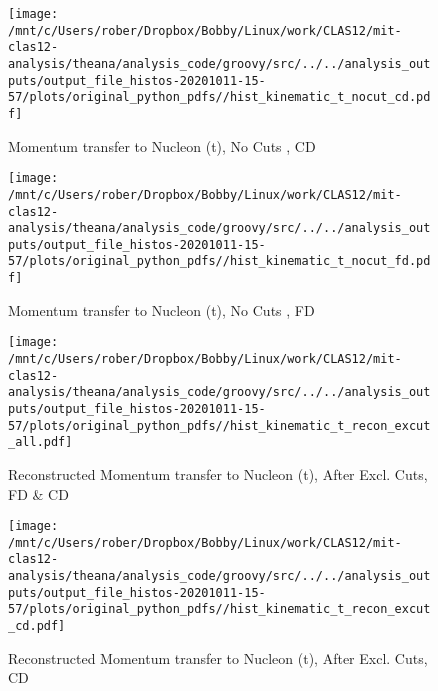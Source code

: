 \documentclass{article}
\begin{document}
\begin{landscape}
    \begin{figure}[h]
        \centering

        \texttt{[image: /mnt/c/Users/rober/Dropbox/Bobby/Linux/work/CLAS12/mit-clas12-analysis/theana/analysis\_code/groovy/src/../../analysis\_outputs/output\_file\_histos-20201011-15-57/plots/original\_python\_pdfs//hist\_kinematic\_t\_nocut\_cd.pdf]}
        \captionsetup{textformat=empty,labelformat=blank}
        \caption{Momentum transfer to Nucleon (t), No Cuts , CD}
    \end{figure}
    \clearpage
    
    \begin{figure}[h]
        \centering

        \texttt{[image: /mnt/c/Users/rober/Dropbox/Bobby/Linux/work/CLAS12/mit-clas12-analysis/theana/analysis\_code/groovy/src/../../analysis\_outputs/output\_file\_histos-20201011-15-57/plots/original\_python\_pdfs//hist\_kinematic\_t\_nocut\_fd.pdf]}
        \captionsetup{textformat=empty,labelformat=blank}
        \caption{Momentum transfer to Nucleon (t), No Cuts , FD}
    \end{figure}
    \clearpage
    
    \begin{figure}[h]
        \centering

        \texttt{[image: /mnt/c/Users/rober/Dropbox/Bobby/Linux/work/CLAS12/mit-clas12-analysis/theana/analysis\_code/groovy/src/../../analysis\_outputs/output\_file\_histos-20201011-15-57/plots/original\_python\_pdfs//hist\_kinematic\_t\_recon\_excut\_all.pdf]}
        \captionsetup{textformat=empty,labelformat=blank}
        \caption{Reconstructed Momentum transfer to Nucleon (t), After Excl. Cuts, FD \& CD}
    \end{figure}
    \clearpage
    
    \begin{figure}[h]
        \centering

        \texttt{[image: /mnt/c/Users/rober/Dropbox/Bobby/Linux/work/CLAS12/mit-clas12-analysis/theana/analysis\_code/groovy/src/../../analysis\_outputs/output\_file\_histos-20201011-15-57/plots/original\_python\_pdfs//hist\_kinematic\_t\_recon\_excut\_cd.pdf]}
        \captionsetup{textformat=empty,labelformat=blank}
        \caption{Reconstructed Momentum transfer to Nucleon (t), After Excl. Cuts, CD}
    \end{figure}
    \clearpage
    
    \begin{figure}[h]
        \centering


\end{figure}
\end{landscape}
\end{document}
